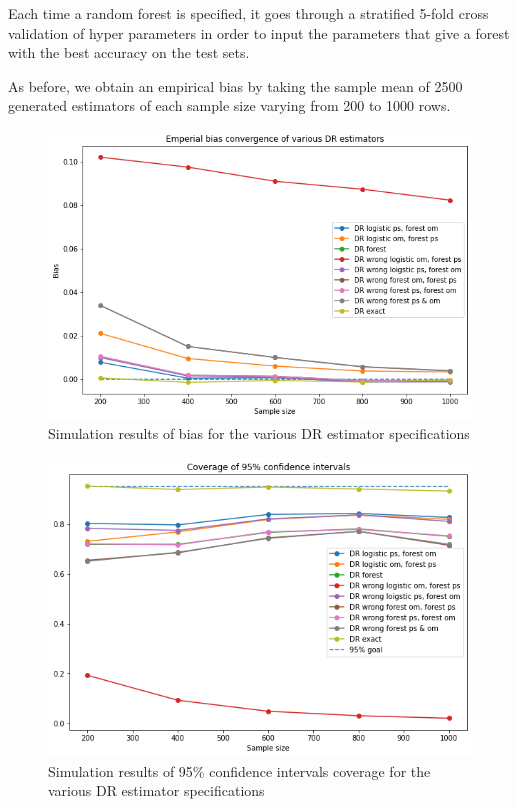 \documentclass[12pt,twoside]{article}
\begin{document}
Each time a random forest is specified, it goes through a stratified 5-fold cross validation of hyper parameters in order to input the parameters that give a forest with the best accuracy on the test sets. 

As before, we obtain an empirical bias by taking the sample mean of 2500 generated estimators of each sample size varying from 200 to 1000 rows.

\begin{figure}[h!]
    \centering
    \includegraphics[width = 0.9\columnwidth]{figures/rf_2W_bias.png}
    \caption{Simulation results of bias for the various DR estimator specifications}
    \label{figbiaspara}
\end{figure}
\begin{figure}[h!]
    \centering
    \includegraphics[width = 0.9\columnwidth]{figures/rf_2W_CI.png}
    \caption{Simulation results of 95\% confidence intervals coverage for the various DR estimator specifications}
    \label{figCIpara}
\end{figure}
\end{document}
